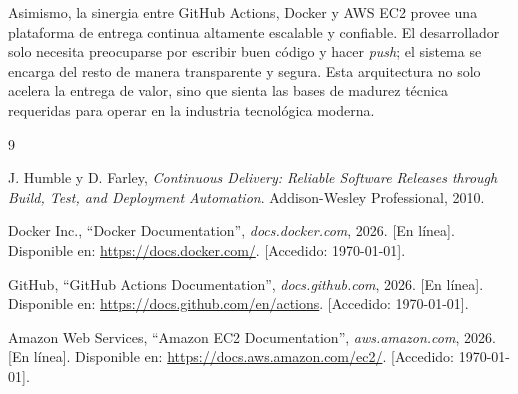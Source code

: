 \documentclass[12pt, a4paper]{article}
\begin{document}
Asimismo, la sinergia entre GitHub Actions, Docker y AWS EC2 provee una plataforma de entrega continua altamente escalable y confiable. El desarrollador solo necesita preocuparse por escribir buen código y hacer \textit{push}; el sistema se encarga del resto de manera transparente y segura. Esta arquitectura no solo acelera la entrega de valor, sino que sienta las bases de madurez técnica requeridas para operar en la industria tecnológica moderna.

\renewcommand{\refname}{Fuentes de Información}
\begin{thebibliography}{9}

J. Humble y D. Farley, \textit{Continuous Delivery: Reliable Software Releases through Build, Test, and Deployment Automation}. Addison-Wesley Professional, 2010.

Docker Inc., ``Docker Documentation'', \textit{docs.docker.com}, 2026. [En línea]. Disponible en: \url{https://docs.docker.com/}. [Accedido: \today].

GitHub, ``GitHub Actions Documentation'', \textit{docs.github.com}, 2026. [En línea]. Disponible en: \url{https://docs.github.com/en/actions}. [Accedido: \today].

Amazon Web Services, ``Amazon EC2 Documentation'', \textit{aws.amazon.com}, 2026. [En línea]. Disponible en: \url{https://docs.aws.amazon.com/ec2/}. [Accedido: \today].

\end{thebibliography}
\end{document}
